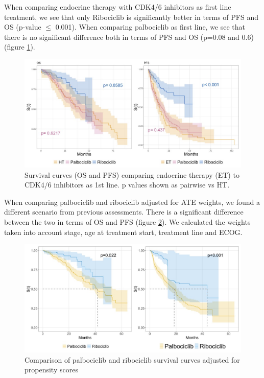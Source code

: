When comparing endocrine therapy with CDK4/6 inhibitors as first line treatment, we see that only Ribociclib is significantly better in terms of PFS and OS (p-value $\le$ 0.001). When comparing palbociclib as first line, we see that there is no significant difference both in terms of PFS and OS (p=0.08 and 0.6)
(figure \ref*{fig:grouped}).
\begin{figure}[ht]
  \centering

  \caption{Survival curves (OS and PFS) comparing endocrine therapy (ET) to CDK4/6 inhibitors as 1st line. p values shown as pairwise vs HT. }\label{fig:grouped} 
  \includegraphics[scale=0.4]{figures/grouped_curve_both.jpeg}%

\end{figure}

When comparing palbociclib and ribociclib adjusted for ATE weights, we found a different scenario from previous assessments. There is a significant difference between the two in terms of OS and PFS (figure \ref*{fig:propensity}). We calculated the weights taken into account stage, age at treatment start, treatment line and ECOG.

\begin{figure}[ht]
  \centering

  \caption{Comparison of palbociclib and ribociclib survival curves adjusted for propensity scores  }\label{fig:propensity} 
  \includegraphics[scale=0.35]{figures/propensity_score_both.jpeg}%

\end{figure}

